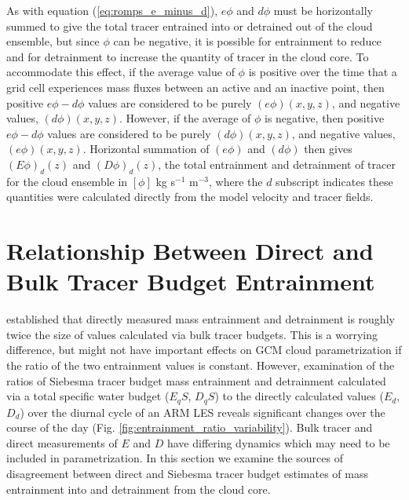 \documentclass[12pt]{article}
\begin{document}
As with equation (\ref{eq:romps_e_minus_d}), $e\phi$ and $d\phi$ must be 
horizontally summed to give the total tracer entrained into or detrained out 
of the cloud ensemble, but since $\phi$ can be negative, it is possible for 
entrainment to reduce and for detrainment to increase the quantity of tracer 
in the cloud core.  To accommodate this effect, if the average value of $\phi$ 
is positive over the time that a grid cell experiences mass fluxes between an 
active and an inactive point, then positive $e\phi-d\phi$ values are 
considered to be purely $(e\phi)(x,y,z)$, and negative values, $(d\phi)(x,y,z)$. 
However, if the average of $\phi$ is negative, then positive $e\phi-d\phi$ 
values are considered to be purely $(d\phi)(x,y,z)$, and negative values, 
$(e\phi)(x,y,z)$.  Horizontal summation of $(e\phi)$ and $(d\phi)$ then 
gives $(E\phi)_d(z)$ and $(D\phi)_d(z)$, the total entrainment and detrainment 
of tracer for the cloud ensemble in $[\phi]$ kg s$^{-1}$ m$^{-3}$, where the 
$d$ subscript indicates these quantities were calculated directly from the 
model velocity and tracer fields.


\section{Relationship Between Direct and Bulk Tracer Budget Entrainment}

\cite{Romps2010} established that directly measured mass entrainment and 
detrainment is roughly twice the size of values calculated via bulk 
tracer budgets.  This is a worrying difference, but might not have important
effects on GCM cloud parametrization if the ratio of the two entrainment 
values is constant.  However, examination of the ratios of Siebesma tracer 
budget mass entrainment and detrainment calculated via a total specific water
budget ($E_qS$, $D_qS$) to the directly calculated values ($E_d$, $D_d$) over 
the diurnal cycle of an ARM LES reveals significant changes over the course 
of the day (Fig. \ref{fig:entrainment_ratio_variability}).  Bulk tracer and
direct measurements of $E$ and $D$ have differing dynamics which may need to 
be included in parametrization.  In this section we examine the sources of
disagreement between direct and Siebesma tracer budget estimates of mass entrainment into and detrainment from the cloud core.

\end{document}
